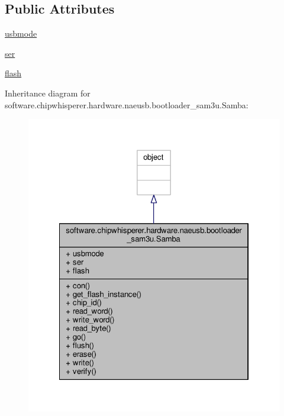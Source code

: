 \subsection*{Public Attributes}
\begin{DoxyCompactItemize}
\item 
\hyperlink{classsoftware_1_1chipwhisperer_1_1hardware_1_1naeusb_1_1bootloader__sam3u_1_1Samba_af9b6adeead18bed98758bd8e4be161fd}{usbmode}
\item 
\hyperlink{classsoftware_1_1chipwhisperer_1_1hardware_1_1naeusb_1_1bootloader__sam3u_1_1Samba_a17f97805e8dd9c84deb97669cc32789a}{ser}
\item 
\hyperlink{classsoftware_1_1chipwhisperer_1_1hardware_1_1naeusb_1_1bootloader__sam3u_1_1Samba_abde43af97bef57ffae2049e6949f838c}{flash}
\end{DoxyCompactItemize}


Inheritance diagram for software.\+chipwhisperer.\+hardware.\+naeusb.\+bootloader\+\_\+sam3u.\+Samba\+:\nopagebreak
\begin{figure}[H]
\begin{center}
\leavevmode
\includegraphics[width=322pt]{d3/d52/classsoftware_1_1chipwhisperer_1_1hardware_1_1naeusb_1_1bootloader__sam3u_1_1Samba__inherit__graph}
\end{center}
\end{figure}


